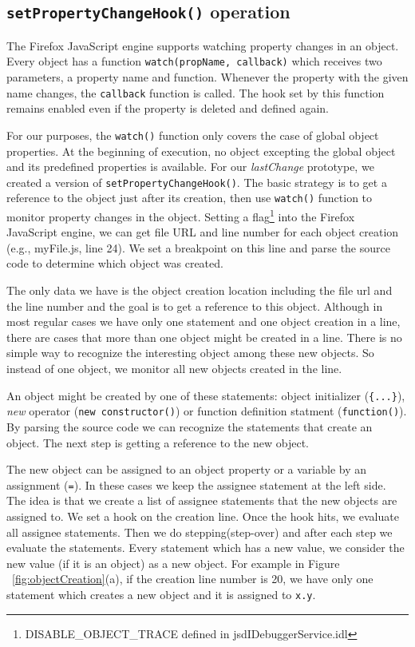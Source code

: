 \documentclass{sig-alternate}
\begin{document}
\subsection{{\normalsize\bf\texttt{setPropertyChangeHook()}} operation}
The Firefox JavaScript engine supports watching property changes in an
object. Every object has a function \texttt{watch(propName, callback)}
which receives two parameters, a property name and function.  Whenever
the property with the given name changes, the \texttt{callback} function is
called. The hook set by this function remains enabled even if the
property is deleted and defined again. 

For our purposes, the \texttt{watch()} function only covers the case
of global object properties. At the beginning of execution, no object
excepting the global object and its predefined properties is available.  For 
our \textit{lastChange} prototype, we created a version of
\texttt{setPropertyChangeHook()}.  The basic strategy is to get a reference to the object just
after its creation, then use \texttt{watch()} function to monitor
property changes in the object. Setting a flag\footnote[4]{DISABLE\_OBJECT\_TRACE defined in jsdIDebuggerService.idl} into the Firefox 
JavaScript engine, we can get file URL and line number for each object
creation (e.g., myFile.js, line 24). We set a breakpoint on this line
and parse the source code to determine which object was created.

The only data we have is the object creation location including the
file url and the line number and the goal is to get a reference to
this object. Although in most regular cases we have only one
statement and one object creation in a line, there are cases that more
than one object might be created in a line. There is no simple way to
recognize the interesting object among these new objects. So instead
of one object, we monitor all new objects created in the line.

An object might be created by one of these statements: object
initializer (\texttt{\{...\}}), \textit{new} operator (\texttt{new 
constructor()}) or function definition statment (\texttt{function()}). 
By parsing the source code we can recognize the statements that
create an object. The next step is getting a reference to the new object.

The new object can be assigned to an object property or a variable by
an assignment (\texttt{=}). In these cases we keep the assignee statement 
at the left side. The idea is that we create a list of assignee statements 
that the new objects are assigned to. We set a hook on the creation
line. Once the hook hits, we evaluate all assignee statements. Then 
we do stepping(step-over) and after each step we evaluate the
statements. Every statement which has a new value, we consider the new
value (if it is an object) as a new object. For example in Figure
~\ref{fig:objectCreation}(a), if the creation line number is 20, we
have only one statement which creates a new object and it is assigned
to \texttt{x.y}.
\end{document}
